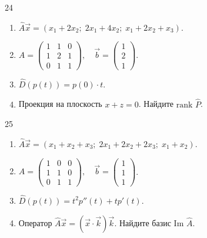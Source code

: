 \documentclass[12pt,a4paper]{article}
\theoremstyle{plain}
\theoremstyle{definition}
\begin{document}
\begin{taskbox}{24}
    \begin{enumerate}
        \item $\hat{A}\vec{x} = (x_1 + 2x_2; \; 2x_1 + 4x_2; \; x_1 + 2x_2 + x_3)$.
        \item $A = \begin{pmatrix} 1 & 1 & 0 \\ 1 & 2 & 1 \\ 0 & 1 & 1 \end{pmatrix}, \quad \vec{b} = \begin{pmatrix} 1 \\ 2 \\ 1 \end{pmatrix}$.
        \item $\hat{D}(p(t)) = p(0) \cdot t$.
        \item Проекция на плоскость $x+z=0$. Найдите $\text{rank } \hat{P}$.
    \end{enumerate}
\end{taskbox}

\begin{taskbox}{25}
    \begin{enumerate}
        \item $\hat{A}\vec{x} = (x_1 + x_2 + x_3; \; 2x_1 + 2x_2 + 2x_3; \; x_1 + x_2)$.
        \item $A = \begin{pmatrix} 1 & 0 & 0 \\ 1 & 1 & 0 \\ 0 & 1 & 1 \end{pmatrix}, \quad \vec{b} = \begin{pmatrix} 1 \\ 1 \\ 1 \end{pmatrix}$.
        \item $\hat{D}(p(t)) = t^2 p''(t) + t p'(t)$.
        \item Оператор $\hat{A}\vec{x} = (\vec{x} \cdot \vec{k})\vec{k}$. Найдите базис $\text{Im } \hat{A}$.
    \end{enumerate}
\end{taskbox}
\end{document}
